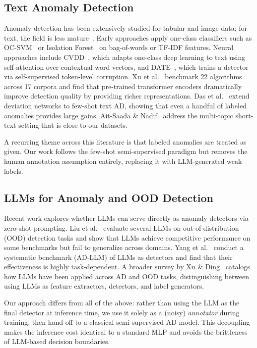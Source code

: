 \documentclass[12pt]{article}
\begin{document}
\subsection{Text Anomaly Detection}

Anomaly detection has been extensively studied for tabular and image data; 
for text, the field is less mature~\cite{pang2021deep, Boutalbi2023}. 
Early approaches apply one-class classifiers such as OC-SVM~\cite{OCSVM} 
or Isolation Forest~\cite{IForest} on bag-of-words or TF-IDF features. 
Neural approaches include CVDD~\cite{ruff-etal-2019-self}, which adapts 
one-class deep learning to text using self-attention over contextual 
word vectors, and DATE~\cite{manolache2021date}, which trains a detector 
via self-supervised token-level corruption. Xu et al.~\cite{xu-etal-2023-comparative} 
benchmark 22 algorithms across 17 corpora and find that pre-trained 
transformer encoders dramatically improve detection quality by providing 
richer representations. Das et al.~\cite{das2023few} extend deviation 
networks to few-shot text AD, showing that even a handful of labeled 
anomalies provides large gains. Ait-Saada \& Nadif~\cite{aitsaada2023} 
address the multi-topic short-text setting that is close to our datasets.

A recurring theme across this literature is that labeled anomalies are 
treated as given. Our work follows the few-shot semi-supervised paradigm 
but removes the human annotation assumption entirely, replacing it with 
LLM-generated weak labels.

\subsection{LLMs for Anomaly and OOD Detection}

Recent work explores whether LLMs can serve directly as anomaly detectors 
via zero-shot prompting. Liu et al.~\cite{liu2024llmood} evaluate several 
LLMs on out-of-distribution (OOD) detection tasks and show that LLMs 
achieve competitive performance on some benchmarks but fail to generalize 
across domains. Yang et al.~\cite{yang2025adllm} conduct a systematic 
benchmark (AD-LLM) of LLMs as detectors and find that their effectiveness 
is highly task-dependent. A broader survey by Xu \& Ding~\cite{xu2024survey} 
catalogs how LLMs have been applied across AD and OOD tasks, distinguishing 
between using LLMs as feature extractors, detectors, and label generators.

Our approach differs from all of the above: rather than using the LLM 
as the final detector at inference time, we use it solely as a (noisy) 
\textit{annotator} during training, then hand off to a classical 
semi-supervised AD model. This decoupling makes the inference cost identical 
to a standard MLP and avoids the brittleness of LLM-based decision boundaries.
\end{document}
